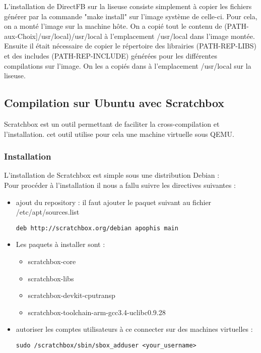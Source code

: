L'installation de DirectFB sur la liseuse consiste simplement à copier les fichiers générer par la commande "make install" sur l'image système de celle-ci. Pour cela, on a monté l'image sur la machine hôte. On a copié tout le contenu de (PATH-aux-Choix]/usr/local)/usr/local à l'emplacement /usr/local dans l'image montée. Ensuite il était nécessaire de copier le répertoire des librairies (PATH-REP-LIBS) et des includes (PATH-REP-INCLUDE) générées pour les différentes compilations sur l'image. On les a copiés dans à l'emplacement /usr/local sur la liseuse. 

\newpage

\subsection{Compilation sur Ubuntu avec Scratchbox}

Scratchbox est un outil permettant de faciliter la cross-compilation et l'installation. cet outil utilise pour cela une machine virtuelle sous QEMU.

\subsubsection{Installation}

L'installation de Scratchbox est simple sous une distribution Debian : \\
Pour procéder à l'installation il nous a fallu suivre les directives suivantes :
\begin{itemize}
	\item ajout du repository :
		il faut ajouter le paquet suivant au fichier /etc/apt/sources.list
		\begin{lstlisting}
deb http://scratchbox.org/debian apophis main
		\end{lstlisting}
	\item 
		Les paquets à installer sont :
			\begin{itemize}
				\item scratchbox-core
				\item scratchbox-libs
				\item scratchbox-devkit-cputransp
				\item scratchbox-toolchain-arm-gcc3.4-uclibc0.9.28
			\end{itemize}
	\item autoriser les comptes utilisateurs à ce connecter sur des machines virtuelles : 
	\begin{lstlisting}
sudo /scratchbox/sbin/sbox_adduser <your_username>
	\end{lstlisting}	
\end{itemize}

